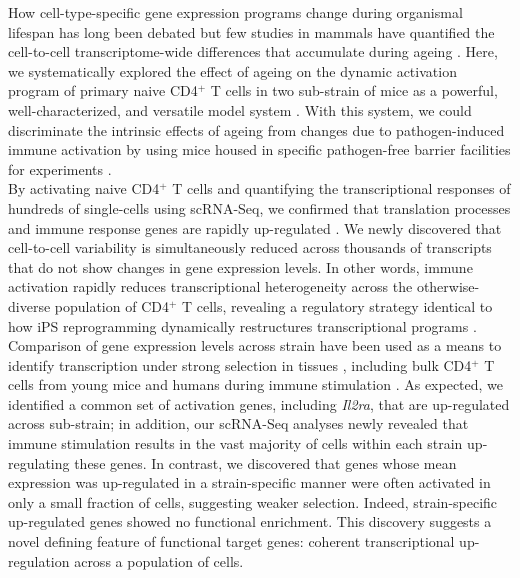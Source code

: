 How cell-type-specific gene expression programs change during organismal lifespan has long been debated \citep{Bahar2006, Warren2007} but few studies in mammals have quantified the cell-to-cell transcriptome-wide differences that accumulate during ageing \citep{Kowalczyk2015}. Here, we systematically explored the effect of ageing on the dynamic activation program of primary naive CD4$^+$ T cells in two sub-strain of mice as a powerful, well-characterized, and versatile model system \citep{Shay2013}. With this system, we could discriminate the intrinsic effects of ageing from changes due to pathogen-induced immune activation by using mice housed in specific pathogen-free barrier facilities for experiments \citep{Beura2016}.\\

By activating naive CD4$^+$ T cells and quantifying the transcriptional responses of hundreds of single-cells using scRNA-Seq, we confirmed that translation processes and immune response genes are rapidly up-regulated \citep{Neme2016, Asmal2003}. We newly discovered that cell-to-cell variability is simultaneously reduced across thousands of transcripts that do not show changes in gene expression levels. In other words, immune activation rapidly reduces transcriptional heterogeneity across the otherwise-diverse population of CD4$^+$ T cells, revealing a regulatory strategy identical to how iPS reprogramming dynamically restructures transcriptional programs \citep{Buganim2012}. \\

Comparison of gene expression levels across strain have been used as a means to identify transcription under strong selection in tissues \citep{Brawand2011, Sudmant2015, Romero2012, Barbosa-Morais2012, Perry2012}, including bulk CD4$^+$ T cells from young mice and humans during immune stimulation \citep{Shay2013}. As expected, we identified a common set of activation genes, including \textit{Il2ra}, that are up-regulated across sub-strain; in addition, our scRNA-Seq analyses newly revealed that immune stimulation results in the vast majority of cells within each strain up-regulating these genes. In contrast, we discovered that genes whose mean expression was up-regulated in a strain-specific manner were often activated in only a small fraction of cells, suggesting weaker selection. Indeed, strain-specific up-regulated genes showed no functional enrichment. This discovery suggests a novel defining feature of functional target genes: coherent transcriptional up-regulation across a population of cells. \\

